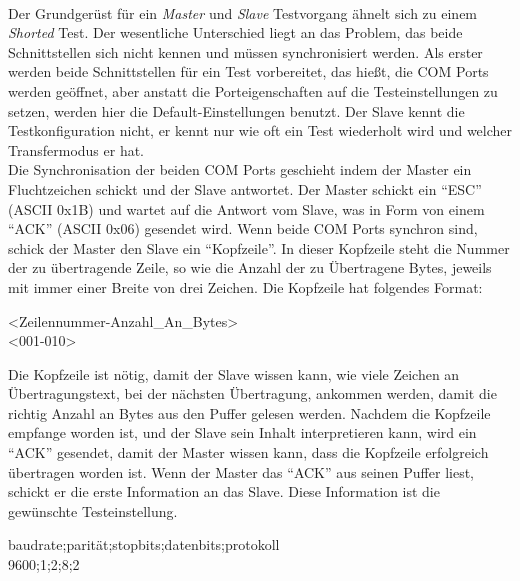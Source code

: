 \paragraph{}
Der Grundgerüst für ein \textit{Master} und \textit{Slave} Testvorgang ähnelt sich zu einem \textit{Shorted} Test. Der wesentliche Unterschied liegt an das Problem, das beide Schnittstellen sich nicht kennen und müssen synchronisiert werden. Als erster werden beide Schnittstellen für ein Test vorbereitet, das hießt, die COM Ports werden geöffnet, aber anstatt die Porteigenschaften auf die Testeinstellungen zu setzen, werden hier die Default-Einstellungen benutzt. Der Slave kennt die Testkonfiguration nicht, er kennt nur wie oft ein Test wiederholt wird und welcher Transfermodus er hat.\\

Die Synchronisation der beiden COM Ports geschieht indem der Master ein Fluchtzeichen schickt und der Slave antwortet. Der Master schickt ein "`ESC"' (ASCII 0x1B) und wartet auf die Antwort vom Slave, was in Form von einem "`ACK"' (ASCII 0x06) gesendet wird. Wenn beide COM Ports synchron sind, schick der Master den Slave ein "`Kopfzeile"'. In dieser Kopfzeile steht die Nummer der zu übertragende Zeile, so wie die Anzahl der zu Übertragene Bytes, jeweils mit immer einer Breite von drei Zeichen. Die Kopfzeile hat folgendes Format:

\begin{center}
<Zeilennummer-Anzahl\_An\_Bytes>\\

<001-010>
\end{center}

Die Kopfzeile ist nötig, damit der Slave wissen kann, wie viele Zeichen an Übertragungstext, bei der nächsten Übertragung, ankommen werden, damit die richtig Anzahl an Bytes aus den Puffer gelesen werden. Nachdem die Kopfzeile empfange worden ist, und der Slave sein Inhalt interpretieren kann, wird ein "`ACK"' gesendet, damit der Master wissen kann, dass die Kopfzeile erfolgreich übertragen worden ist. Wenn der Master das "`ACK"' aus seinen Puffer liest, schickt er die erste Information an das Slave. Diese Information ist die gewünschte Testeinstellung. 
\begin{center}
baudrate;parität;stopbits;datenbits;protokoll\\
9600;1;2;8;2
\end{center}

